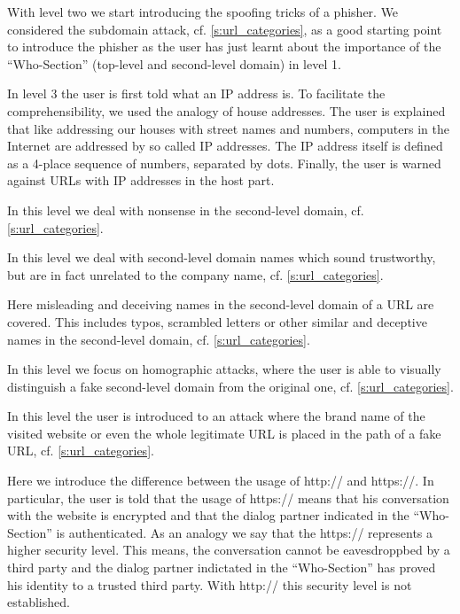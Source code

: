 \begin{description}[leftmargin=0cm]
	\item[Level 2] With level two we start introducing the spoofing tricks of a phisher.
 We considered the subdomain attack, cf. \autoref{s:url_categories}, as a good starting point to introduce the phisher as the user has just learnt about the importance of the ``Who-Section'' (top-level and second-level domain) in level 1.
	\item[Level 3] In level 3 the user is first told what an IP address is.
 To facilitate the comprehensibility, we used the analogy of house addresses.
 The user is explained that like addressing our houses with street names and numbers, computers in the Internet are addressed by so called IP addresses.
 The IP address itself is defined as a 4-place sequence of numbers, separated by dots.
 Finally, the user is warned against URLs with IP addresses in the host part.

	\item[Level 4] In this level we deal with nonsense in the second-level domain, cf. \autoref{s:url_categories}.
	\item[Level 5] In this level we deal with second-level domain names which sound trustworthy, but are in fact unrelated to the company name, cf. \autoref{s:url_categories}.
	\item[Level 6] Here misleading and deceiving names in the second-level domain of a URL are covered.
 This includes typos, scrambled letters or other similar and deceptive names in the second-level domain, cf. \autoref{s:url_categories}.
	\item[Level 7] In this level we focus on homographic attacks, where the user is able to visually distinguish a fake second-level domain from the original one, cf. \autoref{s:url_categories}.
	\item[Level 8] In this level the user is introduced to an attack where the brand name of the visited website or even the whole legitimate URL is placed in the path of a fake URL, cf. \autoref{s:url_categories}.
	\item[Level 9] Here we introduce the difference between the usage of http:// and https://. In particular, the user is told that the usage of https:// means that his conversation with the website is encrypted and that the dialog partner indicated in the ``Who-Section'' is authenticated.
 As an analogy we say that the https:// represents a higher security level.
 This means, the conversation cannot be eavesdroppbed by a third party and the dialog partner indictated in the ``Who-Section'' has proved his identity to a trusted third party.
 With http:// this security level is not established.


\end{description}
